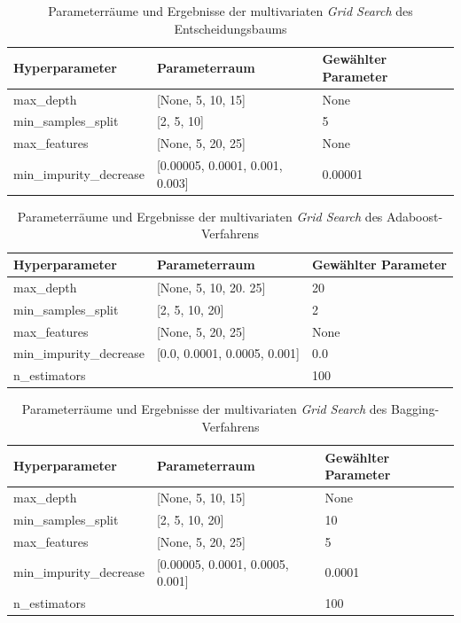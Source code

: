 \begin{table}[H]
	\centering
	\begin{tabular}{lll}
		\hline
		Hyperparameter          & Parameterraum                       & Gewählter Parameter \\ \hline
		max\_depth              & {[}None, 5, 10, 15{]}               & None                \\
		min\_samples\_split     & {[}2, 5, 10{]}                      & 5                   \\
		max\_features           & {[}None, 5, 20, 25{]}               & None                \\
		min\_impurity\_decrease & {[}0.00005, 0.0001, 0.001, 0.003{]} & 0.00001             \\ \hline
	\end{tabular}
	\caption{\label{table:parameter_grid_multivariat_tree} Parameterräume und Ergebnisse der multivariaten \emph{Grid Search} des Entscheidungsbaums}
\end{table}

\begin{table}[H]
	\centering
	\begin{tabular}{lll}
		\hline
		Hyperparameter          & Parameterraum                        & Gewählter Parameter \\ \hline
		max\_depth              & {[}None, 5, 10, 20. 25{]}                & 20                   \\
		min\_samples\_split     & {[}2, 5, 10, 20{]}                   & 2                  \\
		max\_features           & {[}None, 5, 20, 25{]}                & None                  \\
		min\_impurity\_decrease & {[}0.0, 0.0001, 0.0005, 0.001{]} & 0.0             \\ 
		n\_estimators &  & 100 \\ \hline
	\end{tabular}
	\caption{\label{table:parameter_grid_multivariat_adaboost} Parameterräume und Ergebnisse der multivariaten \emph{Grid Search} des Adaboost-Verfahrens}
\end{table}

\begin{table}[H]
	\centering
	\begin{tabular}{lll}
		\hline
		Hyperparameter          & Parameterraum                        & Gewählter Parameter \\ \hline
		max\_depth              & {[}None, 5, 10, 15{]}                & None                \\
		min\_samples\_split     & {[}2, 5, 10, 20{]}                   & 10                  \\
		max\_features           & {[}None, 5, 20, 25{]}                & 5                   \\
		min\_impurity\_decrease & {[}0.00005, 0.0001, 0.0005, 0.001{]} & 0.0001              \\ 
		n\_estimators &  & 100 \\ \hline
	\end{tabular}
	\caption{\label{table:parameter_grid_multivariat_bagging} Parameterräume und Ergebnisse der multivariaten \emph{Grid Search} des Bagging-Verfahrens}
\end{table}
